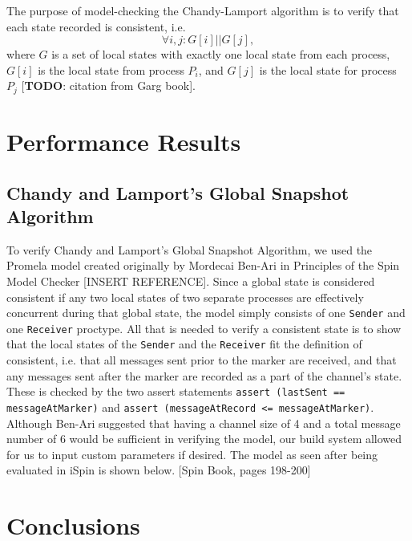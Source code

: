 \documentclass[12pt]{article}
\begin{document}
\begin{flushleft}
The purpose of model-checking the Chandy-Lamport algorithm is to verify that each state recorded is consistent, i.e. $$\forall i,j:G[i]||G[j],$$ where $G$ is a set of local states with exactly one local state from each process, $G[i]$ is the local state from process $P_i$, and $G[j]$ is the local state for process $P_j$ [\textbf{TODO}: citation from Garg book].

\section{Performance Results}
\subsection{Chandy and Lamport's Global Snapshot Algorithm}
To verify Chandy and Lamport's Global Snapshot Algorithm, we used the Promela model created originally by Mordecai Ben-Ari in Principles of the Spin Model Checker [INSERT REFERENCE]. Since a global state is considered consistent if any two local states of two separate processes are effectively concurrent during that global state, the model simply consists of one \texttt{Sender} and one \texttt{Receiver} proctype. All that is needed to verify a consistent state is to show that the local states of the \texttt{Sender} and the \texttt{Receiver} fit the definition of consistent, i.e. that all messages sent prior to the marker are received, and that any messages sent after the marker are recorded as a part of the channel's state. These is checked by the two assert statements \texttt{assert (lastSent == messageAtMarker)} and \texttt{assert (messageAtRecord <= messageAtMarker)}. Although Ben-Ari suggested that having a channel size of 4 and a total message number of 6 would be sufficient in verifying the model, our build system allowed for us to input custom parameters if desired. The model as seen after being evaluated in iSpin is shown below.
[Spin Book, pages 198-200]
\section{Conclusions}

\end{flushleft}
\end{document}
